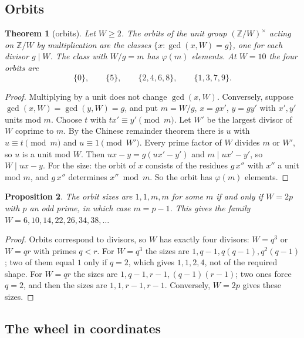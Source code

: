 \documentclass[11pt]{article}
\newcommand{\Z}{\mathbb Z}
\theoremstyle{plain}
\newtheorem{theorem}{Theorem}
\newtheorem{proposition}[theorem]{Proposition}
\theoremstyle{definition}
\theoremstyle{remark}
\begin{document}
\subsection{Orbits}

\begin{theorem}[orbits]\label{thm:wheel}
Let $W\ge2$. The orbits of the unit group $(\Z/W)^\times$ acting on $\Z/W$ by multiplication are
the classes $\{x:\gcd(x,W)=g\}$, one for each divisor $g\mid W$. The class with $W/g=m$ has
$\varphi(m)$ elements. At $W=10$ the four orbits are
\[
\{0\},\qquad \{5\},\qquad \{2,4,6,8\},\qquad \{1,3,7,9\}.
\]
\end{theorem}
\begin{proof}
Multiplying by a unit does not change $\gcd(x,W)$. Conversely, suppose $\gcd(x,W)=\gcd(y,W)=g$, and
put $m=W/g$, $x=gx'$, $y=gy'$ with $x',y'$ units mod $m$. Choose $t$ with $tx'\equiv y'\pmod m$. Let
$W'$ be the largest divisor of $W$ coprime to $m$. By the Chinese remainder theorem there is $u$
with $u\equiv t\pmod m$ and $u\equiv1\pmod{W'}$. Every prime factor of $W$ divides $m$ or $W'$, so
$u$ is a unit mod $W$. Then $ux-y=g(ux'-y')$ and $m\mid ux'-y'$, so $W\mid ux-y$. For the size: the
orbit of $x$ consists of the residues $g\,x''$ with $x''$ a unit mod $m$, and $g\,x''$ determines
$x''\bmod m$. So the orbit has $\varphi(m)$ elements.
\end{proof}

\begin{proposition}\label{prop:2p}
The orbit sizes are $1,1,m,m$ for some $m$ if and only if $W=2p$ with $p$ an odd prime, in which
case $m=p-1$. This gives the family $W=6,10,14,22,26,34,38,\dots$
\end{proposition}
\begin{proof}
Orbits correspond to divisors, so $W$ has exactly four divisors: $W=q^3$ or $W=qr$ with primes
$q<r$. For $W=q^3$ the sizes are $1,q-1,q(q-1),q^2(q-1)$; two of them equal $1$ only if $q=2$, which
gives $1,1,2,4$, not of the required shape. For $W=qr$ the sizes are $1,q-1,r-1,(q-1)(r-1)$; two
ones force $q=2$, and then the sizes are $1,1,r-1,r-1$. Conversely, $W=2p$ gives these sizes.
\end{proof}

\subsection{The wheel in coordinates}
\end{document}

